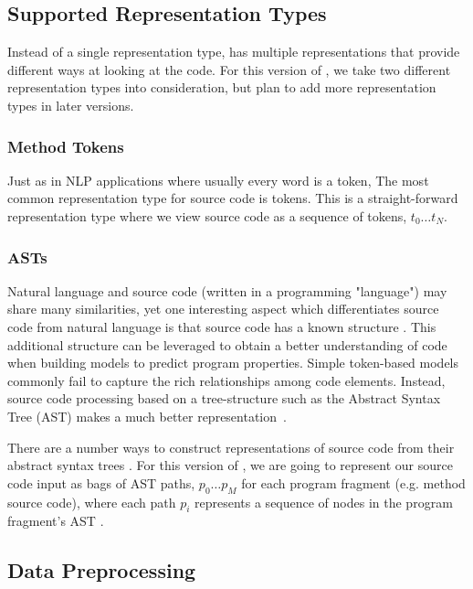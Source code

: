 \documentclass[sigplan,review,anonymous]{acmart}\settopmatter{printfolios=true,printccs=false,printacmref=false}
\begin{document}
\subsection{Supported Representation Types}
Instead of a single representation type, \benchmarkName has multiple representations that provide different ways at looking at the code. For this version of \benchmarkName, we take two different representation types into consideration, but plan to add more representation types in later versions. 

\subsubsection{Method Tokens}
Just as in NLP applications where usually every word is a token, The most common representation type for source code is tokens. This is a straight-forward representation type where we view source code as a sequence of tokens, $t_0 \dots t_N$.  

\subsubsection{ASTs}
Natural language and source code (written in a programming "language") may share many similarities, yet one interesting aspect which differentiates source code from natural language is that source code has a known structure \citep{DBLP:journals/corr/MaddisonT14,DBLP:journals/corr/abs-1711-00740,DBLP:journals/corr/abs-1803-09544}. This additional structure can be leveraged to obtain a better understanding of code when building models to predict program properties. Simple token-based models commonly fail to capture the rich relationships among code elements. Instead, source code processing based on a tree-structure such as the Abstract Syntax Tree (AST) makes a much better representation~\citep{DBLP:journals/corr/MaddisonT14}. 

There are a number ways to construct representations of source code from their abstract syntax trees \citep{DBLP:journals/corr/abs-1803-09544,DBLP:journals/corr/abs-1710-11054,HyperbolicFuncEMBED}. For this version of \benchmarkName, we are going to represent our source code input as bags of AST paths, $p_0 \dots p_M$ for each program fragment (e.g. method source code), where each path $p_i$ represents a sequence of nodes in the program fragment's AST \citep{DBLP:journals/corr/abs-1803-09544}.

\subsection{Data Preprocessing}
\end{document}
